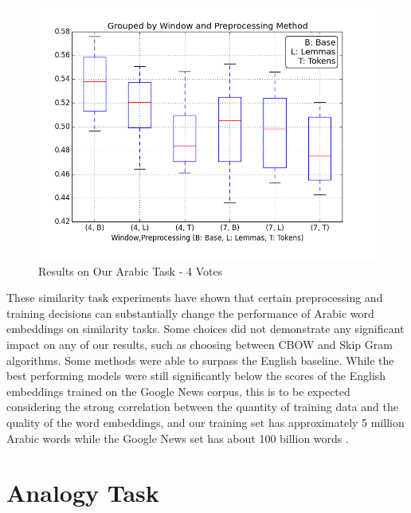 \begin{figure}
  \includegraphics[width=\linewidth]{results_spearman/ar_similiarity_task_4_votes_results_spearplot.png}
  \caption{Results on Our Arabic Task - 4 Votes}
  \label{fig:spearplot4}
\end{figure}



These similarity task experiments have shown that certain preprocessing and training decisions can substantially change the performance of Arabic word embeddings on similarity tasks. Some choices did not demonstrate any significant impact on any of our results, such as choosing between CBOW and Skip Gram algorithms. Some methods were able to surpass the English baseline. While the best performing models were still significantly below the scores of the English embeddings trained on the Google News corpus, this is to be expected considering the strong correlation between the quantity of training data and the quality of the word embeddings, and our training set has approximately 5 million Arabic words while the Google News set has about 100 billion words \cite{mikolovdist:2013}.

\section{Analogy Task}

